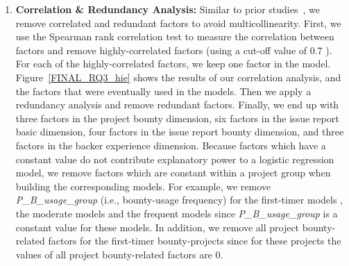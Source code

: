 \documentclass[10pt,journal,compsoc]{IEEEtran}
\begin{document}
\begin{appendices}
	\begin{enumerate}
		\item \textbf{Correlation \& Redundancy Analysis:}  Similar to prior studies~\cite{gopi:2017,wang2017understanding,mcintosh2016empirical,kabinna2018examining}, we remove correlated and redundant factors to avoid multicollinearity.
      First, we use the Spearman rank correlation test to measure the correlation between factors and remove highly-correlated factors (using a cut-off value of 0.7 \cite{gopi:2017,wang2017understanding,mcintosh2016empirical,kabinna2018examining}). For each of the highly-correlated factors, we keep one factor in the model. Figure~\ref{FINAL_RQ3_hie} shows the results of our correlation analysis, and the factors that were eventually used in the models. Then we apply a redundancy analysis and remove redundant factors.
      Finally, we end up with three factors in the project bounty dimension, six factors in the issue report basic dimension, four factors in the issue report bounty dimension, and three factors in the backer experience dimension.
      Because factors which have a constant value do not contribute explanatory power to a logistic regression model, we remove factors which are constant within a project group when building the corresponding models. For example, we remove \textit{P\_B\_usage\_group} (i.e., bounty-usage frequency) for the first-timer models , the moderate models and the frequent models since \textit{P\_B\_usage\_group} is a constant value for these models. In addition, we remove all project bounty-related factors for the first-timer bounty-projects since for these projects the values of all project bounty-related factors are 0.


\end{enumerate}
\end{appendices}
\end{document}
